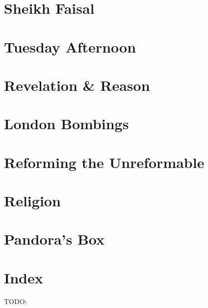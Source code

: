 \documentclass[12pt]{memoir}
\begin{document}
\chapter{Sheikh Faisal}
\chapter{Tuesday Afternoon}
\chapter{Revelation \& Reason}
\chapter{London Bombings}
\chapter{Reforming the Unreformable}
\chapter{Religion}
\chapter{Pandora’s Box}


\backmatter

\chapter{Index}
TODO:
\end{document}
